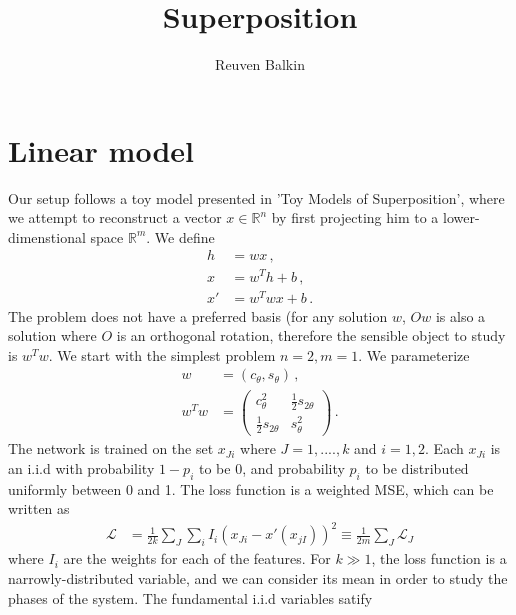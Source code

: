 \documentclass[a4paper]{article}
\title{Superposition}
\author{Reuven Balkin}
\begin{document}
\maketitle

\makeatother
\noindent
\newcommand{\dif}{\mathtext{d}}
\section{Linear model}
Our setup follows a toy model presented in 'Toy Models of Superposition', where we attempt to reconstruct a vector $x \in \mathbb{R}^n$ by first projecting him to a lower-dimenstional space $\mathbb{R}^m$. We define
\begin{align}
h &= w x \,,
\\
x &= w^T h + b\,,
\\
x' &=  w^T w x + b\,.
\end{align}
The problem does not have a preferred basis (for any solution $w$, $Ow$ is also a solution where $O$ is an orthogonal rotation, therefore the sensible object to study is $w^T w$.
We start with the simplest problem $n=2,m=1$. We parameterize
\begin{align}
w &= (c_\theta, s_\theta)\,,
\\
w^T w &= \begin{pmatrix}
c^2_\theta & \frac12 s_{2\theta} 
\\
\frac12 s_{2\theta} & s^2_\theta
\end{pmatrix}\,.
\end{align}
The network is trained on the set $x_{Ji}$ where $J=1,....,k$ and $i=1,2$. Each $x_{Ji}$ is an i.i.d with probability $1-p_i$ to be 0, and probability $p_i$ to be distributed uniformly between 0 and 1.  The loss function is a weighted MSE, which can be written as
\begin{align}
\mathcal{L} &= \frac{1}{2k} \sum_{J}\sum_{i} I_i (x_{Ji}-x'(x_{jI}))^2 \equiv   \frac{1}{2m} \sum_{J} \mathcal{L}_J
\end{align}
where $I_i $ are the weights for each of the features. For $k \gg 1$, the loss function is a narrowly-distributed variable, and we can consider its mean in order to study the phases of the system. The fundamental i.i.d variables satify
\end{document}
